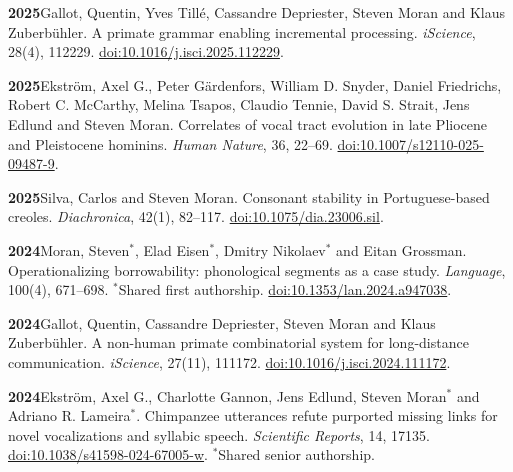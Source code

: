 \documentclass[11pt]{article}
\newcommand{\hangpara}{
 \setlength{\parindent}{0in} %
 \hangindent=0.42in %
}
\begin{document}
\vskip 6pt
\hangpara
{\bf 2025}\hspace{1ex}Gallot, Quentin, Yves Tillé, Cassandre Depriester, Steven Moran and Klaus Zuberbühler. A primate grammar enabling incremental processing. \textit{iScience}, 28(4), 112229. \href{https://doi.org/10.1016/j.isci.2025.112229}{doi:10.1016/\allowbreak j.isci.2025.112229}.

\vskip 6pt
\hangpara
{\bf 2025}\hspace{1ex}Ekström, Axel G., Peter Gärdenfors, William D. Snyder, Daniel Friedrichs, Robert C. McCarthy, Melina Tsapos, Claudio Tennie, David S. Strait, Jens Edlund and Steven Moran. Correlates of vocal tract evolution in late Pliocene and Pleistocene hominins. \textit{Human Nature}, 36, 22--69. \href{https://doi.org/10.1007/s12110-025-09487-9}{doi:10.1007/s12110-025-09487-9}. %

\vskip 6pt
\hangpara
{\bf 2025}\hspace{1ex}Silva, Carlos and Steven Moran. Consonant stability in Portuguese-based creoles. \textit{Diachronica}, 42(1), 82--117. \href{https://doi.org/10.1075/dia.23006.sil}{doi:10.1075/dia.23006.sil}.

\vskip 6pt
\hangpara
{\bf 2024}\hspace{1ex}Moran, Steven$^*$, Elad Eisen$^*$, Dmitry Nikolaev$^*$ and Eitan Grossman. Operationalizing borrowability: phonological segments as a case study. \textit{Language}, 100(4), 671--698. $^*$Shared first authorship. \href{https://dx.doi.org/10.1353/lan.2024.a947038}{doi:10.1353/lan.2024.a947038}.%

\vskip 6pt
\hangpara
{\bf 2024}\hspace{1ex}Gallot, Quentin, Cassandre Depriester, Steven Moran and Klaus Zuberbühler. A non-human primate combinatorial system for long-distance communication. \textit{iScience}, 27(11), 111172. \href{https://doi.org/10.1016/j.isci.2024.111172}{doi:10.1016/j.isci.2024.111172}.

\vskip 6pt
\hangpara
{\bf 2024}\hspace{1ex}Ekström, Axel G., Charlotte Gannon, Jens Edlund, Steven Moran$^*$ and Adriano R. Lameira$^*$. Chimpanzee utterances refute purported missing links for novel vocalizations and syllabic speech. \textit{Scientific Reports}, 14, 17135. \href{https://doi.org/10.1038/s41598-024-67005-w}{doi:10.1038/s41598-024-67005-w}. $^*$Shared senior authorship.
\end{document}
